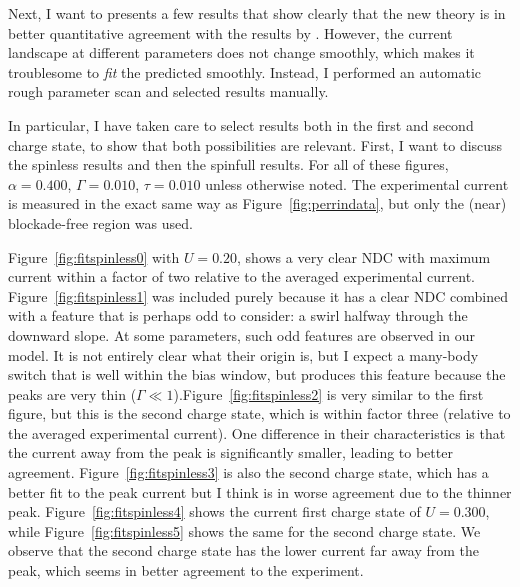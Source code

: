 Next, I want to presents a few results that show clearly that the new theory is in better quantitative agreement with the results by \citet{perrinnano}. However, the current landscape at different parameters does not change smoothly, which makes it troublesome to \emph{fit} the predicted smoothly. Instead, I performed an automatic rough parameter scan and selected results manually.

In particular, I have taken care to select results both in the first and second charge state, to show that both possibilities are relevant. First, I want to discuss the spinless results and then the spinfull results. For all of these figures, $\alpha=0.400$, $\Gamma=0.010$, $\tau=0.010$ unless otherwise noted. The experimental current is measured in the exact same way as Figure~\ref{fig:perrindata}, but only the (near) blockade-free region was used.

Figure~\ref{fig:fitspinless0} with $U=0.20$, shows a very clear NDC with maximum current within a factor of two relative to the averaged experimental current. Figure~\ref{fig:fitspinless1} was included purely because it has a clear NDC combined with a feature that is perhaps odd to consider: a swirl halfway through the downward slope. At some parameters, such odd features are observed in our model. It is not entirely clear what their origin is, but I expect a many-body switch that is well within the bias window, but produces this feature because the peaks are very thin ($\Gamma \ll 1$).Figure~\ref{fig:fitspinless2} is very similar to the first figure, but this is the second charge state, which is within factor three (relative to the averaged experimental current). One difference in their characteristics is that the current away from the peak is significantly smaller, leading to better agreement. Figure~\ref{fig:fitspinless3} is also the second charge state, which has a better fit to the peak current but I think is in worse agreement due to the thinner peak. Figure~\ref{fig:fitspinless4} shows the current  first charge state of $U=0.300$, while Figure~\ref{fig:fitspinless5} shows the same for the second charge state. We observe that the second charge state has the lower current far away from the peak, which seems in better agreement to the experiment.

